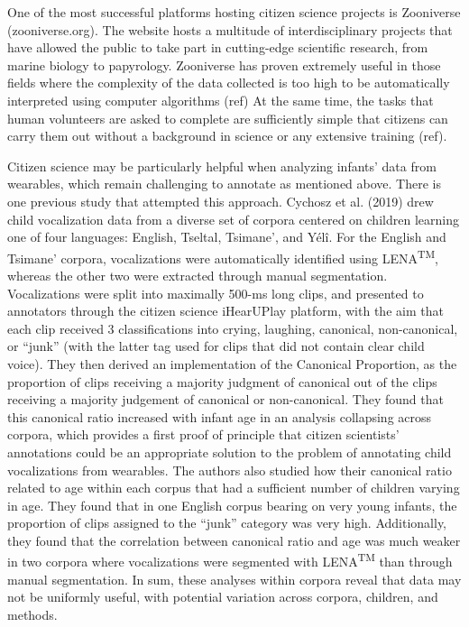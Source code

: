 \documentclass[english,,man,floatsintext]{apa6}
\begin{document}
One of the most successful platforms hosting citizen science projects is Zooniverse (zooniverse.org). The website hosts a multitude of interdisciplinary projects that have allowed the public to take part in cutting-edge scientific research, from marine biology to papyrology. Zooniverse has proven extremely useful in those fields where the complexity of the data collected is too high to be automatically interpreted using computer algorithms (ref) At the same time, the tasks that human volunteers are asked to complete are sufficiently simple that citizens can carry them out without a background in science or any extensive training (ref).

Citizen science may be particularly helpful when analyzing infants' data from wearables, which remain challenging to annotate as mentioned above. There is one previous study that attempted this approach. Cychosz et al. (2019) drew child vocalization data from a diverse set of corpora centered on children learning one of four languages: English, Tseltal, Tsimane', and Yélî. For the English and Tsimane' corpora, vocalizations were automatically identified using LENA\textsuperscript{TM}, whereas the other two were extracted through manual segmentation. Vocalizations were split into maximally 500-ms long clips, and presented to annotators through the citizen science iHearUPlay platform, with the aim that each clip received 3 classifications into crying, laughing, canonical, non-canonical, or \enquote{junk} (with the latter tag used for clips that did not contain clear child voice). They then derived an implementation of the Canonical Proportion, as the proportion of clips receiving a majority judgment of canonical out of the clips receiving a majority judgement of canonical or non-canonical. They found that this canonical ratio increased with infant age in an analysis collapsing across corpora, which provides a first proof of principle that citizen scientists' annotations could be an appropriate solution to the problem of annotating child vocalizations from wearables. The authors also studied how their canonical ratio related to age within each corpus that had a sufficient number of children varying in age. They found that in one English corpus bearing on very young infants, the proportion of clips assigned to the \enquote{junk} category was very high. Additionally, they found that the correlation between canonical ratio and age was much weaker in two corpora where vocalizations were segmented with LENA\textsuperscript{TM} than through manual segmentation. In sum, these analyses within corpora reveal that data may not be uniformly useful, with potential variation across corpora, children, and methods.
\end{document}

